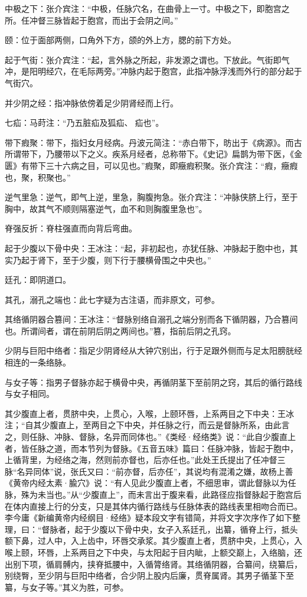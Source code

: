 \documentclass[12pt]{ctexbook}%
\begin{document}
\begin{jiaozhu}
  \item 中极之下：张介宾注：“中极，任脉穴名，在曲骨上一寸。中极之下，即胞宫之所。任冲督三脉皆起于胞宫，而出于会阴之间。”
  \item 颐：位于面部两侧，口角外下方，颌的外上方，腮的前下方处。
  \item 起于气街：张介宾注：“起，言外脉之所起，非发源之谓也。下放此。气街即气冲，是阳明经穴，在毛际两旁。”冲脉内起于胞宫，此指冲脉浮浅而外行的部分起于气街穴。
  \item 并少阴之经：指冲脉依傍着足少阴肾经而上行。
  \item 七疝：马莳注：“乃五脏疝及狐疝、𤻊疝也”。
  \item 带下瘕聚：带下，指妇女月经病。丹波元简注：“赤白带下，昉出于《病源》。而古所谓带下，乃腰带以下之义。疾系月经者，总称带下。《史记》扁鹊为带下医，《金匮》有带下三十六病之目，可以见也。”瘕聚，即癥瘕积聚。张介宾注：“瘕，癥瘕也，聚，积聚也。”
  \item 逆气里急：逆气，即气上逆，里急，胸腹拘急。张介宾注：“冲脉侠脐上行，至于胸中，故其气不顺则隔塞逆气，血不和则胸腹里急也”。
  \item 脊强反折：脊柱强直而向背后弯曲。
  \item 起于少腹以下骨中央：王冰注：“起，非初起也，亦犹任脉、冲脉起于胞中也，其实乃起于肾下，至于少腹，则下行于腰横骨围之中央也。”
  \item 廷孔：即阴道口。
  \item 其孔，溺孔之端也：此七字疑为古注语，而非原文，可参。
  \item 其络循阴器合篡间：王冰注：“督脉别络自溺孔之端分别而各下循阴器，乃合篡间也。所谓间者，谓在前阴后阴之两间也。”篡，指前后阴之孔窍。
  \item 少阴与巨阳中络者：指足少阴肾经从大钟穴别出，行于足跟外侧而与足太阳膀胱经相连的一条络脉。
  \item 与女子等：指男子督脉亦起于横骨中央，再循阴茎下至前阴之窍，其后的循行路线与女子相同。
  \item 其少腹直上者，贯脐中央，上贯心，入喉，上颐环唇，上系两目之下中夬：王冰注；“自其少腹直上，至两目之下中央，并任脉之行，而云是督脉所系，由此言之，则任脉、冲脉、督脉，名异而同体也。”《类经·经络类》说：“此自少腹直上者，皆任脉之道，而本节列为督脉。《五音五味》篇曰：任脉冲脉，皆起于胞中，上循背里，为经络之海，然则前亦督也，后亦任也。”此处王氏提出了任冲督三脉“名异同体”说，张氏又曰：“前亦督，后亦任”，其说均有混淆之嫌，故杨上善《黄帝内经太素·腧穴》说：“有人见此少腹直上者，不细思审，谓此督脉以为任脉，殊为未当也。”从“少腹直上”，而未言出于腹来看，此路径应指督脉起于胞宫后在体内直接上行的分支，只是其体内循行路线与任脉体表的路线表里相吻合而已。李今庸《新编黄帝内经纲目·经络》疑本段文字有错简，并将文字次序作了如下整理，曰：“督脉者，起于少腹以下骨中央，女子入系廷孔，出纂，循脊上行，抵头额下鼻，过人中，入上齿中，环唇交承浆。其少腹直上者，贯脐中央，上贯心，入喉上颐，环唇，上系两目之下中央，与太阳起于目内眦，上额交巅上，入络脑，还出别下项，循肩髆内，挟脊抵腰中，入循膂络肾。其络循阴器，合纂间，绕纂后，别绕臀，至少阴与巨阳中络者，合少阴上股内后廉，贯脊属肾。其男子循茎下至纂，与女子等。”其义为胜，可参。

\end{jiaozhu}
\end{document}
